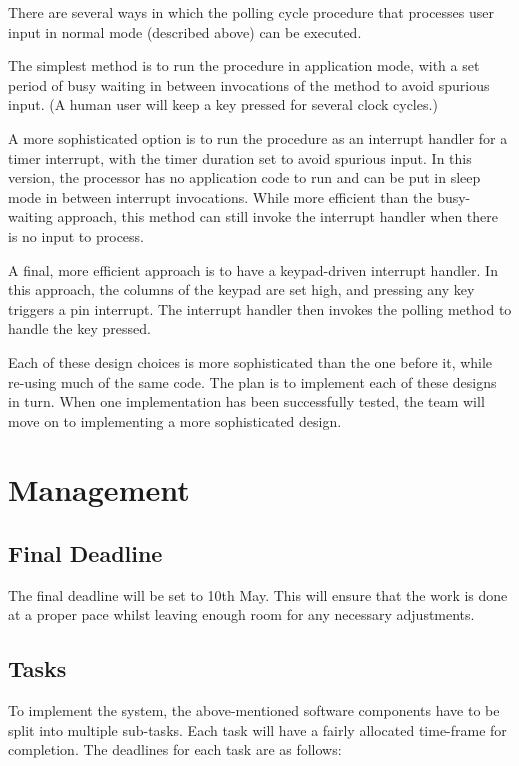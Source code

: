 \documentclass[11pt,a4paper,twocolumn]{scrartcl}
\begin{document}
There are several ways in which the polling cycle procedure that processes user input in normal mode (described above) can be executed.

The simplest method is to run the procedure in application mode, with a set period of busy waiting in between invocations of the method to avoid spurious input.
(A human user will keep a key pressed for several clock cycles.)

A more sophisticated option is to run the procedure as an interrupt handler for a timer interrupt, with the timer duration set to avoid spurious input. In this version, the processor has no application code to run and can be put in sleep mode in between interrupt invocations. While more efficient than the busy-waiting approach, this method can still invoke the interrupt handler when there is no input to process.

A final, more efficient approach is to have a keypad-driven interrupt handler. In this approach, the columns of the keypad are set high, and pressing any key
triggers a pin interrupt. The interrupt handler then invokes the polling method to handle the key pressed.

Each of these design choices is more sophisticated than the one before it, while re-using much of the same code. The plan is to implement each of these designs in turn. When one implementation has been successfully tested, the team will move on to implementing a more sophisticated design.

\section{Management} \label{schedule}
\subsection{Final Deadline}
The final deadline will be set to 10th May. This will ensure that the work is done at a proper pace whilst leaving enough room for any necessary 
adjustments.

\subsection{Tasks}
To implement the system, the above-mentioned software components have to be split into multiple sub-tasks. Each task will have a fairly allocated time-frame for completion. The deadlines for each task are as follows:
\end{document}
